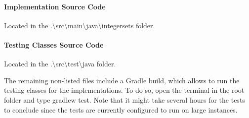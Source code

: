 \paragraph*{Implementation Source Code} Located in the {\ttfamily .\textbackslash src\textbackslash main\textbackslash java\textbackslash integersets} folder.

\paragraph*{Testing Classes Source Code} Located in the {\ttfamily.\textbackslash src\textbackslash test\textbackslash java} folder.

The remaining non-listed files include a {\ttfamily Gradle} build, which allows to run the testing classes for the implementations. To do so, open the terminal in the root folder and type {\ttfamily gradlew test}. Note that it might take several hours for the tests to conclude since the tests are currently configured to run on large instances.